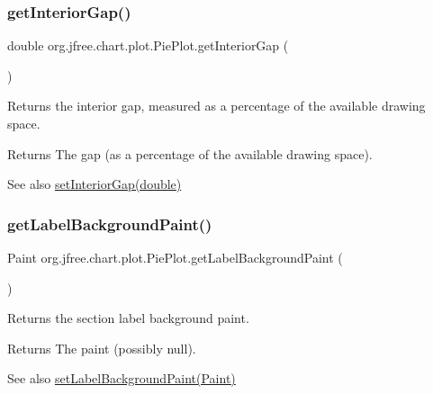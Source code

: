 \subsubsection{\texorpdfstring{get\+Interior\+Gap()}{getInteriorGap()}}
{\footnotesize\ttfamily double org.\+jfree.\+chart.\+plot.\+Pie\+Plot.\+get\+Interior\+Gap (\begin{DoxyParamCaption}{ }\end{DoxyParamCaption})}

Returns the interior gap, measured as a percentage of the available drawing space.

\begin{DoxyReturn}{Returns}
The gap (as a percentage of the available drawing space).
\end{DoxyReturn}
\begin{DoxySeeAlso}{See also}
\mbox{\hyperlink{classorg_1_1jfree_1_1chart_1_1plot_1_1_pie_plot_ae35995953830e84173411620ffa8549d}{set\+Interior\+Gap(double)}} 
\end{DoxySeeAlso}
\mbox{\label{classorg_1_1jfree_1_1chart_1_1plot_1_1_pie_plot_a72c8c0c1dd775a541ceee105c9611e7f}} 
\subsubsection{\texorpdfstring{get\+Label\+Background\+Paint()}{getLabelBackgroundPaint()}}
{\footnotesize\ttfamily Paint org.\+jfree.\+chart.\+plot.\+Pie\+Plot.\+get\+Label\+Background\+Paint (\begin{DoxyParamCaption}{ }\end{DoxyParamCaption})}

Returns the section label background paint.

\begin{DoxyReturn}{Returns}
The paint (possibly {\ttfamily null}).
\end{DoxyReturn}
\begin{DoxySeeAlso}{See also}
\mbox{\hyperlink{classorg_1_1jfree_1_1chart_1_1plot_1_1_pie_plot_a649f6e9bb10b1b0ce48910e2aae15ed1}{set\+Label\+Background\+Paint(\+Paint)}} 
\end{DoxySeeAlso}
\mbox{\label{classorg_1_1jfree_1_1chart_1_1plot_1_1_pie_plot_aafd371a674bb115b8d8a0df95d138101}} 
